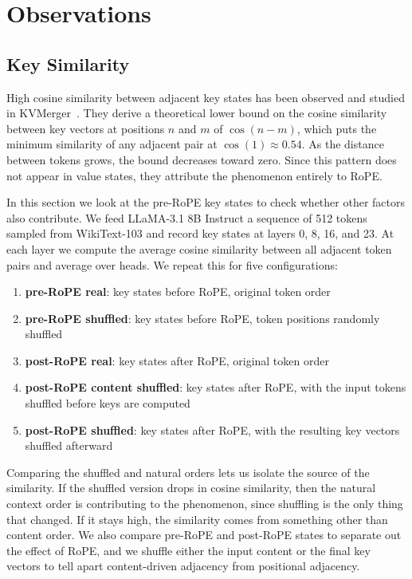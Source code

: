 \section{Observations}
\label{sec:observations}

\subsection{Key Similarity}

High cosine similarity between adjacent key states has been observed and studied in KVMerger~\citep{wang2024kvmerger}.
They derive a theoretical lower bound on the cosine similarity between key vectors at positions $n$ and $m$ of $\cos(n - m)$, which puts the minimum similarity of any adjacent pair at $\cos(1) \approx 0.54$.
As the distance between tokens grows, the bound decreases toward zero.
Since this pattern does not appear in value states, they attribute the phenomenon entirely to RoPE.

In this section we look at the pre-RoPE key states to check whether other factors also contribute.
We feed LLaMA-3.1 8B Instruct a sequence of 512 tokens sampled from WikiText-103 and record key states at layers 0, 8, 16, and 23.
At each layer we compute the average cosine similarity between all adjacent token pairs and average over heads.
We repeat this for five configurations:

\begin{enumerate}
    \item \textbf{pre-RoPE real}: key states before RoPE, original token order
    \item \textbf{pre-RoPE shuffled}: key states before RoPE, token positions randomly shuffled
    \item \textbf{post-RoPE real}: key states after RoPE, original token order
    \item \textbf{post-RoPE content shuffled}: key states after RoPE, with the input tokens shuffled before keys are computed
    \item \textbf{post-RoPE shuffled}: key states after RoPE, with the resulting key vectors shuffled afterward
\end{enumerate}

Comparing the shuffled and natural orders lets us isolate the source of the similarity. If the shuffled version drops in cosine similarity, then the natural context order is contributing to the phenomenon, since shuffling is the only thing that changed. If it stays high, the similarity comes from something other than content order. We also compare pre-RoPE and post-RoPE states to separate out the effect of RoPE, and we shuffle either the input content or the final key vectors to tell apart content-driven adjacency from positional adjacency.


